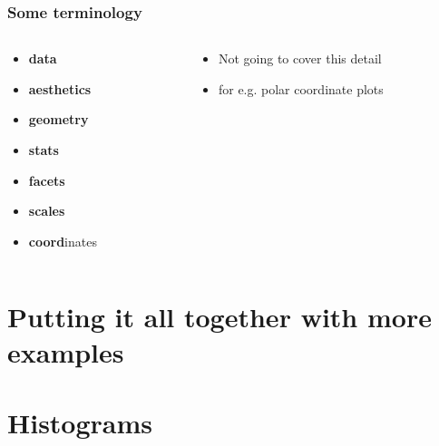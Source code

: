 \documentclass{beamer}\usepackage[]{graphicx}\usepackage[]{color}
\begin{document}
\begin{frame}[fragile]
\frametitle{Some terminology}
\begin{columns}[t]

\begin{column}[T]{3cm}
\begin{itemize}
    \item \textbf{\color{gray}data}
    \item \textbf{\color{gray}aesthetics}
    \item \textbf{\color{gray}geometry}
    \item \textbf{\color{gray}stats}
    \item \textbf{\color{gray}facets}
    \item \textbf{\color{gray}scales}
    \item \textbf{coord}inates
\end{itemize}
\end{column}

\begin{column}[T]{8cm}
\begin{itemize}
    \item Not going to cover this detail
    \item for e.g. polar coordinate plots
\end{itemize}
\end{column}

\end{columns}
\end{frame}


\section*{Putting it all together with more examples}
\frame{\sectionpage}


\section*{Histograms}
\frame{\sectionpage}

\end{document}
